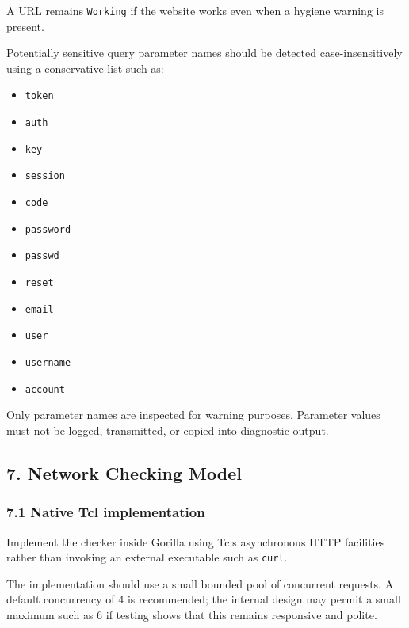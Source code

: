 \documentclass[
  letterpaper,
]{article}
\newcommand{\passthrough}[1]{#1}
\providecommand{\tightlist}{%
  \setlength{\itemsep}{0pt}\setlength{\parskip}{0pt}}
\begin{document}
A URL remains \passthrough{\lstinline!Working!} if the website works even when a hygiene warning is present.

Potentially sensitive query parameter names should be detected case-insensitively using a conservative list such as:

\begin{itemize}
\tightlist
\item
  \passthrough{\lstinline!token!}
\item
  \passthrough{\lstinline!auth!}
\item
  \passthrough{\lstinline!key!}
\item
  \passthrough{\lstinline!session!}
\item
  \passthrough{\lstinline!code!}
\item
  \passthrough{\lstinline!password!}
\item
  \passthrough{\lstinline!passwd!}
\item
  \passthrough{\lstinline!reset!}
\item
  \passthrough{\lstinline!email!}
\item
  \passthrough{\lstinline!user!}
\item
  \passthrough{\lstinline!username!}
\item
  \passthrough{\lstinline!account!}
\end{itemize}

Only parameter names are inspected for warning purposes. Parameter values must not be logged, transmitted, or copied
into diagnostic output.

\subsection{7. Network Checking Model}\label{7-network-checking-model}

\subsubsection{7.1 Native Tcl implementation}\label{71-native-tcl-implementation}

Implement the checker inside Gorilla using Tcl\textquotesingle s asynchronous HTTP facilities rather than invoking an
external executable such as \passthrough{\lstinline!curl!}.

The implementation should use a small bounded pool of concurrent requests. A default concurrency of 4 is recommended;
the internal design may permit a small maximum such as 6 if testing shows that this remains responsive and polite.
\end{document}
